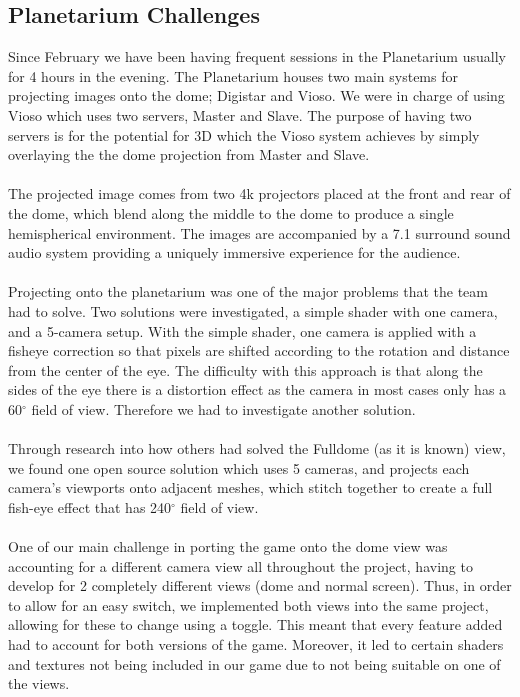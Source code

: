 \documentclass[11pt,a4paper]{article}
\begin{document}
\subsection{Planetarium Challenges}
 Since February we have been having frequent sessions in the Planetarium usually for 4 hours in the evening. The Planetarium houses two main systems for projecting images onto the dome; Digistar and Vioso. We were in charge of using Vioso which uses two servers, Master and Slave. The purpose of having two servers is for the potential for 3D which the Vioso system achieves by simply overlaying the the dome projection from Master and Slave. \\ \\
 The projected image comes from two 4k projectors placed at the front and rear of the dome, which blend along the middle to the dome to produce a single hemispherical environment. The images are accompanied by a 7.1 surround sound audio system providing a uniquely immersive experience for the audience.  \\ \\ 
 Projecting onto the planetarium was one of the major problems that the team had to solve. Two solutions were investigated, a simple shader with one camera, and a 5-camera setup. 
 With the simple shader, one camera is applied with a fisheye correction so that pixels are shifted according to the rotation and distance from the center of the eye. The difficulty with this approach is that along the sides of the eye there is a distortion effect as the camera in most cases only has a 60$^{\circ}$ field of view. Therefore we had to investigate another solution. \\ \\
 Through research into how others had solved the Fulldome (as it is known) view, we found one open source solution which uses 5 cameras, and projects each camera's viewports onto adjacent meshes, which stitch together to create a full fish-eye effect that has 240$^{\circ}$ field of view. \\ \\
 One of our main challenge in porting the game onto the dome view was accounting for a different camera view all throughout the project, having to develop for 2 completely different views (dome and normal screen). Thus, in order to allow for an easy switch, we implemented both views into the same project, allowing for these to change using a toggle. This meant that every feature added had to account for both versions of the game. Moreover, it led to certain shaders and textures not being included in our game due to not being suitable on one of the views.
      \pagebreak
\end{document}
